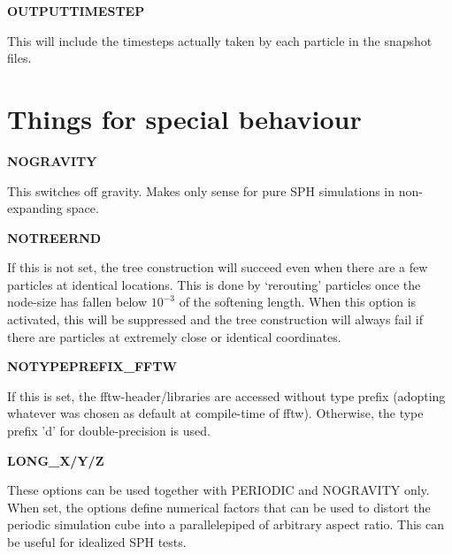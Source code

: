 \begin{DoxyItemize}
\item {\bfseries OUTPUTTIMESTEP} \par
 This will include the timesteps actually taken by each particle in the snapshot files.
\end{DoxyItemize}

\par
 \hypertarget{Gadget-Makefile_secmake7}{}\section{Things for special behaviour}\label{Gadget-Makefile_secmake7}

\begin{DoxyItemize}
\item {\bfseries NOGRAVITY} \par
 This switches off gravity. Makes only sense for pure SPH simulations in non-\/expanding space.
\end{DoxyItemize}


\begin{DoxyItemize}
\item {\bfseries NOTREERND} \par
 If this is not set, the tree construction will succeed even when there are a few particles at identical locations. This is done by `rerouting' particles once the node-\/size has fallen below $10^{-3}$ of the softening length. When this option is activated, this will be suppressed and the tree construction will always fail if there are particles at extremely close or identical coordinates.
\end{DoxyItemize}


\begin{DoxyItemize}
\item {\bfseries NOTYPEPREFIX\_\-FFTW} \par
 If this is set, the fftw-\/header/libraries are accessed without type prefix (adopting whatever was chosen as default at compile-\/time of fftw). Otherwise, the type prefix 'd' for double-\/precision is used.
\end{DoxyItemize}


\begin{DoxyItemize}
\item {\bfseries LONG\_\-X/Y/Z} \par
 These options can be used together with PERIODIC and NOGRAVITY only. When set, the options define numerical factors that can be used to distort the periodic simulation cube into a parallelepiped of arbitrary aspect ratio. This can be useful for idealized SPH tests.
\end{DoxyItemize}


